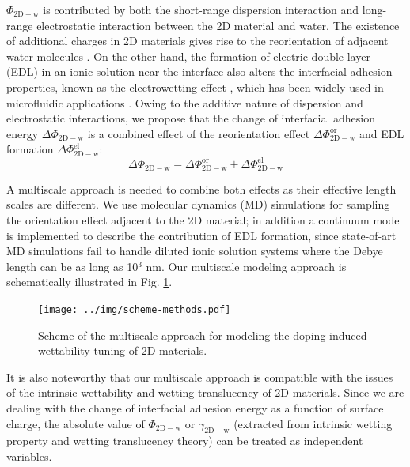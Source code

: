 \documentclass[journal=ancac3,manuscript=article,email=true]{achemso}
\begin{document}
\(\Phi_{\mathrm{2D-w}}\) is contributed by both the
short-range dispersion interaction and long-range electrostatic
interaction between the 2D material and water. The existence of
additional charges in 2D materials gives rise to the reorientation of
adjacent water molecules \cite{ostrowski_tunable_2014}. On the other
hand, the formation of electric double layer (EDL) in an ionic
solution near the interface also alters the interfacial adhesion
properties, known as the electrowetting effect \cite{Lippmann_1908},
which has been widely used in microfluidic applications
\cite{Mugele_2005}.  Owing to the additive nature of dispersion and
electrostatic interactions, we propose that the change of interfacial
adhesion energy \(\Delta \Phi_{\mathrm{2D-w}}\) is a combined effect of
the reorientation effect \(\Delta \Phi_{\mathrm{2D-w}}^{\mathrm{or}}\) and EDL
formation \(\Delta \Phi_{\mathrm{2D-w}}^{\mathrm{el}}\):
\begin{equation}
\label{eqn:contrib-adhesion-change}
\Delta \Phi_{\mathrm{2D-w}} = \Delta \Phi_{\mathrm{2D-w}}^{\mathrm{or}}
                              + \Delta \Phi_{\mathrm{2D-w}}^{\mathrm{el}}
\end{equation}

A multiscale approach is needed to combine both effects as their
effective length scales are different. We use molecular dynamics (MD)
simulations for sampling the orientation effect adjacent to the 2D
material; in addition a continuum model is implemented to describe the
contribution of EDL formation, since state-of-art MD simulations fail to
handle diluted ionic solution systems where the Debye length can be as
long as 10\(^{\text{3}}\) nm. Our multiscale modeling approach is schematically illustrated in Fig. \ref{fig:scheme-method}.

\begin{figure}[htbp]
\centering
\texttt{[image: ../img/scheme-methods.pdf]}
\caption{\label{fig:scheme-method}
Scheme of the multiscale approach for modeling the doping-induced wettability tuning of 2D materials.}
\end{figure}

It is also noteworthy that our multiscale approach is compatible with
the issues of the intrinsic wettability and wetting translucency of 2D
materials. Since we are dealing with the change of interfacial
adhesion energy as a function of surface charge, the absolute value of
\(\Phi_{\mathrm{2D-w}}\) or \(\gamma_{\mathrm{2D-w}}\) (extracted from intrinsic wetting property and wetting translucency theory) can be treated as
independent variables.
\end{document}
